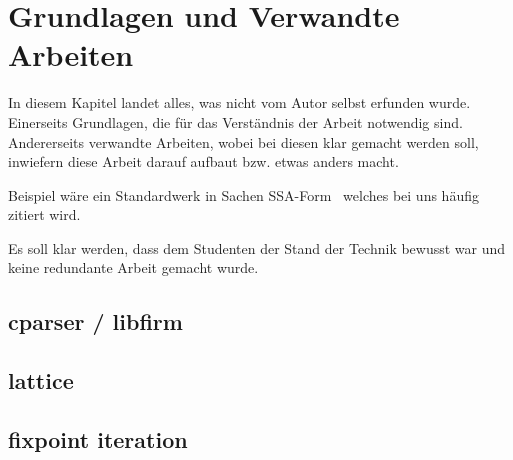 \chapter{Grundlagen und Verwandte Arbeiten}\label{sec:basics}

In diesem Kapitel landet alles,
was nicht vom Autor selbst erfunden wurde.
Einerseits Grundlagen,
die für das Verständnis der Arbeit notwendig sind.
Andererseits verwandte Arbeiten,
wobei bei diesen klar gemacht werden soll,
inwiefern diese Arbeit darauf aufbaut bzw. etwas anders macht.

Beispiel wäre ein Standardwerk in Sachen SSA-Form~\cite{cytron91}
welches bei uns häufig zitiert wird.

Es soll klar werden,
dass dem Studenten der Stand der Technik bewusst war
und keine redundante Arbeit gemacht wurde.

\section{cparser / libfirm}
\section{lattice}
\section{fixpoint iteration}
